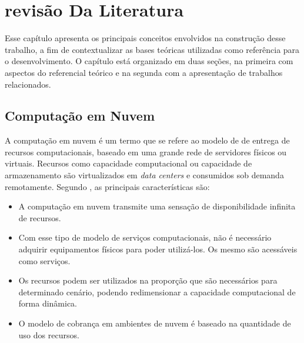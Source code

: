 \chapter{revis\~ao Da Literatura}
\label{cap:revisaoDaLiteratura}

Esse capítulo apresenta os principais conceitos envolvidos na construção desse trabalho, a fim de contextualizar as bases teóricas utilizadas como referência para o desenvolvimento. O capítulo está organizado em duas seções, na primeira com aspectos do referencial teórico e na segunda com a apresentação de trabalhos relacionados.

\section{Computa\c{c}\~ao em Nuvem}
\label{sec:computacaoEmNuvem}

A computação em nuvem é um termo que se refere ao modelo de de entrega de recursos computacionais, baseado em uma grande rede de servidores físicos ou virtuais. Recursos como capacidade computacional ou capacidade de armazenamento são virtualizados em \textit{data centers} e consumidos sob demanda remotamente. Segundo \citet{taurioncloud}, as principais características são:

\begin{itemize}
    \item A computação em nuvem transmite uma sensação de disponibilidade infinita de recursos.

    \item Com esse tipo de modelo de serviços computacionais, não é necessário adquirir equipamentos físicos para poder utilizá-los. Os mesmo são acessáveis como serviços.

    \item Os recursos podem ser utilizados na proporção que são necessários para determinado cenário, podendo redimensionar a capacidade computacional de forma dinâmica.

    \item O modelo de cobrança em ambientes de nuvem é baseado na quantidade de uso dos recursos.
\end{itemize}

